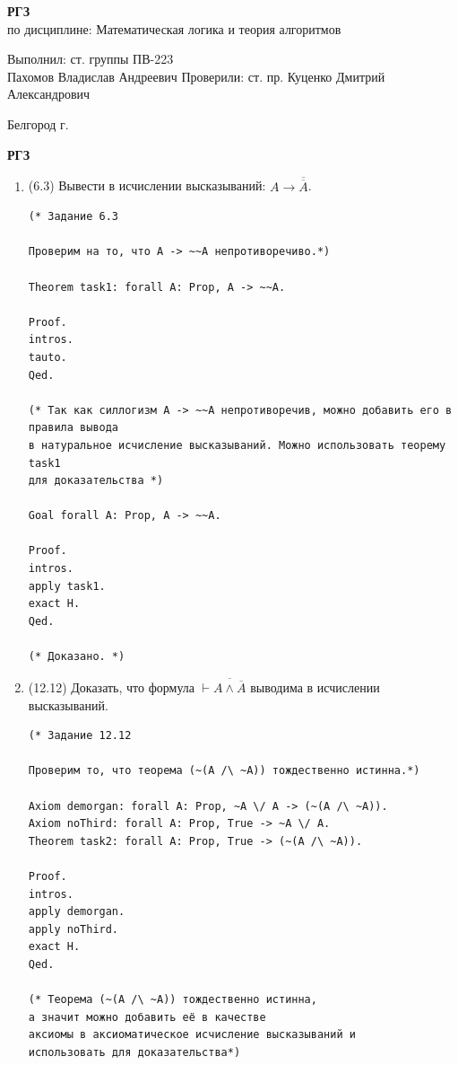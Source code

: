 \documentclass[a4paper,14pt]{extarticle}
\newcommand\textbox[1]{
	\parbox{.45\textwidth}{#1}
}
\begin{document}
\vfill
\begin{center}
	\large{
		\textbf{
			РГЗ}}\\
	\normalsize{
		по дисциплине: Математическая логика и теория алгоритмов}
\end{center}
\vfill
\hfill\textbox{
	Выполнил: ст. группы ПВ-223\\Пахомов Владислав Андреевич
	\bigbreak
	Проверили: ст. пр. Куценко Дмитрий\\Александрович
}
\vfill\begin{center}
	Белгород \the\year г.
\end{center}
\newpage
\begin{center}
	\textbf{РГЗ}
\end{center}
\begin{enumerate}
    \item (6.3) Вывести в исчислении высказываний: $A \rightarrow \overline{\overline{A}}$. 
\begin{verbatim}
(* Задание 6.3

Проверим на то, что A -> ~~A непротиворечиво.*)

Theorem task1: forall A: Prop, A -> ~~A.

Proof.
intros.
tauto.
Qed.

(* Так как силлогизм A -> ~~A непротиворечив, можно добавить его в правила вывода
в натуральное исчисление высказываний. Можно использовать теорему task1 
для доказательства *)

Goal forall A: Prop, A -> ~~A.

Proof.
intros.
apply task1.
exact H.
Qed.

(* Доказано. *)
\end{verbatim}
\item (12.12) Доказать, что формула $\vdash \overline{A \wedge \overline{A}}$ выводима в исчислении высказываний.
\begin{verbatim}
(* Задание 12.12

Проверим то, что теорема (~(A /\ ~A)) тождественно истинна.*)

Axiom demorgan: forall A: Prop, ~A \/ A -> (~(A /\ ~A)).
Axiom noThird: forall A: Prop, True -> ~A \/ A.
Theorem task2: forall A: Prop, True -> (~(A /\ ~A)).

Proof.
intros.
apply demorgan.
apply noThird.
exact H.
Qed.

(* Теорема (~(A /\ ~A)) тождественно истинна, 
а значит можно добавить её в качестве
аксиомы в аксиоматическое исчисление высказываний и 
использовать для доказательства*)


\end{verbatim}
\end{enumerate}
\end{document}
